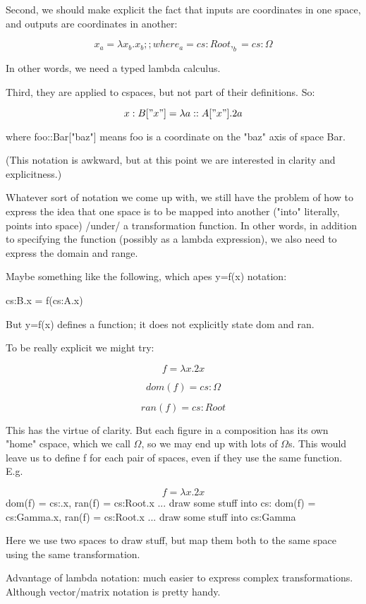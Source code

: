 \documentclass[12pt]{tufte-handout}
\numberwithin{equation}{subsection}
\numberwithin{equation}{subsection}
\begin{document}
  Second, we should make explicit the fact that inputs are coordinates
  in one space, and outputs are coordinates in another:

  $$x_a = \lambda x_b.x_b  ;; where _a = cs:Root, _b = cs:\Omega$$

  In other words, we need a typed lambda calculus.

  Third, they are applied to cspaces, but not part of their definitions.
  So:

  \begin{equation}
    x:B["x"] = \lambda a::A["x"].2a
  \end{equation}


  where foo::Bar["baz"] means foo is a coordinate on the "baz" axis of space Bar.

  (This notation is awkward, but at this point we are interested in
  clarity and explicitness.)

  Whatever sort of notation we come up with, we still have the problem
  of how to express the idea that one space is to be mapped into another
  ("into" literally, points into space) /under/ a transformation
  function.  In other words, in addition to specifying the function
  (possibly as a lambda expression), we also need to express the domain
  and range.

  Maybe something like the following, which apes y=f(x) notation:

  cs:B.x = f(cs:A.x)

  But y=f(x) defines a function; it does not explicitly state dom and ran.

  To be really explicit we might try:

  $$f = \lambda x.2x$$

  $$dom(f) = cs:\Omega$$

  $$ran(f) = cs:Root$$

  This has the virtue of clarity.  But each figure in a composition has
  its own "home" cspace, which we call $\Omega$, so we may end up with lots
  of $\Omega$s.  This would leave us to define f for each pair of spaces,
  even if they use the same function.  E.g.


  $$f = \lambda x.2x$$
  dom(f) = cs:\Omega.x, ran(f) = cs:Root.x
  ... draw some stuff into cs:\Omega
  dom(f) = cs:Gamma.x, ran(f) = cs:Root.x
  ... draw some stuff into cs:Gamma

  Here we use two spaces to draw stuff, but map them both to the same
  space using the same transformation.

  Advantage of lambda notation: much easier to express complex
  transformations.  Although vector/matrix notation is pretty handy.
\end{document}
